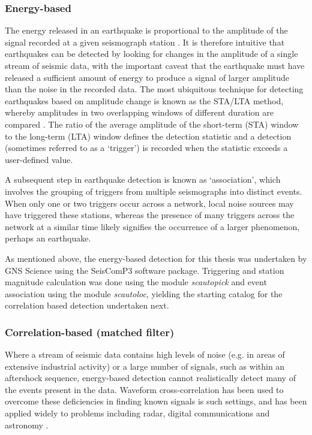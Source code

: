 \subsubsection{Energy-based}\label{STA/LTA}
The energy released in an earthquake is proportional to the amplitude of the signal recorded at a given seismograph station \citep{stein_2000}. It is therefore intuitive that earthquakes can be detected by looking for changes in the amplitude of a single stream of seismic data, with the important caveat that the earthquake must have released a sufficient amount of energy to produce a signal of larger amplitude than the noise in the recorded data. The most ubiquitous technique for detecting earthquakes based on amplitude change is known as the STA/LTA method, whereby amplitudes in two overlapping windows of different duration are compared \citep{withers1998comparison}. The ratio of the average amplitude of the short-term (STA) window to the long-term (LTA) window defines the detection statistic and a detection (sometimes referred to as a `trigger') is recorded when the statistic exceeds a user-defined value.

A subsequent step in earthquake detection is known as `association', which involves the grouping of triggers from multiple seismographs into distinct events. When only one or two triggers occur across a network, local noise sources may have triggered these stations, whereas the presence of many triggers across the network at a similar time likely signifies the occurrence of a larger phenomenon, perhaps an earthquake.

As mentioned above, the energy-based detection for this thesis was undertaken by GNS Science using the SeisComP3 software package. Triggering and station magnitude calculation was done using the module \textit{scautopick} and event association using the module \textit{scautoloc}, yielding the starting catalog for the correlation based detection undertaken next.

\subsubsection{Correlation-based (matched filter)}\label{MF}
Where a stream of seismic data contains high levels of noise (e.g. in areas of extensive industrial activity) or a large number of signals, such as within an aftershock sequence, energy-based detection cannot realistically detect many of the events present in the data. Waveform cross-correlation has been used to overcome these deficiencies in finding known signals is such settings, and has been applied widely to problems including radar, digital communications and astronomy \citep[e.g.][]{Turin_1960,Abbott_2016}.

